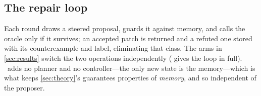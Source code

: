 \subsection{The repair loop}
Each round draws a steered proposal, guards it against memory, and calls the
oracle only if it survives; an accepted patch is returned and a refuted one
stored with its counterexample and label, eliminating that class. The arms in
\cref{sec:results} switch the two operations independently
( gives the loop in full). \CEGMem\ adds no
planner and no controller---the only new state is the memory---which is what
keeps \cref{sec:theory}'s guarantees properties of \emph{memory}, and so
independent of the proposer.

\ifsuppmatter\else\fi
